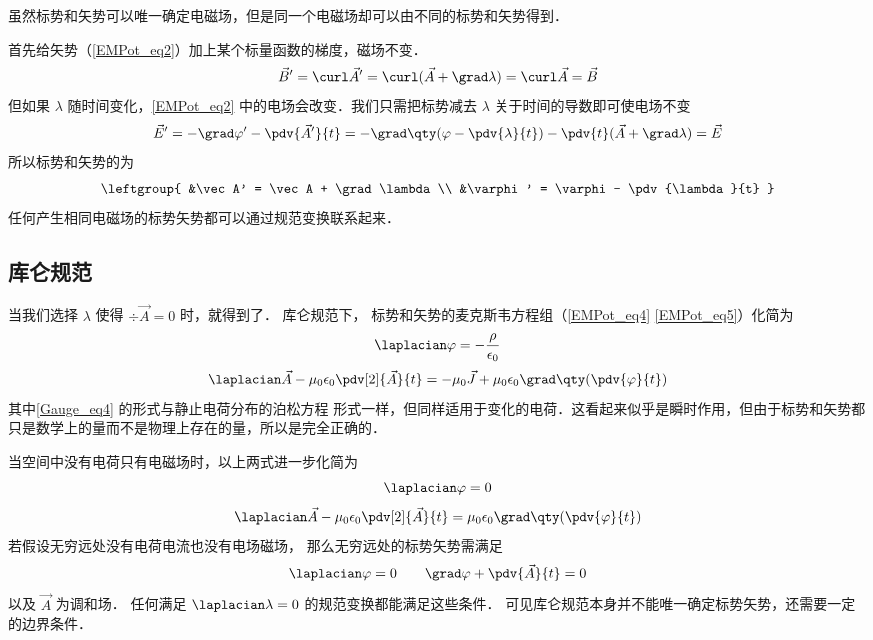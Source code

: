
虽然标势和矢势可以唯一确定电磁场，但是同一个电磁场却可以由不同的标势和矢势得到．

首先给矢势（\autoref{EMPot_eq2}）加上某个标量函数的梯度，磁场不变．
\begin{equation}
\vec B' = \curl \vec A' = \curl (\vec A + \grad \lambda) = \curl \vec A = \vec B
\end{equation}
但如果 $\lambda$ 随时间变化，\autoref{EMPot_eq2} 中的电场会改变．我们只需把标势减去 $\lambda$ 关于时间的导数即可使电场不变
\begin{equation}
\vec E' = -\grad \varphi' - \pdv{\vec A'}{t} = -\grad \qty(\varphi - \pdv{\lambda}{t}) - \pdv{t} (\vec A + \grad \lambda) = \vec E
\end{equation}
所以标势和矢势的为
\begin{equation}\label{EMPot_eq3}
\leftgroup{
&\vec A' = \vec A + \grad \lambda\\
&\varphi' = \varphi - \pdv{\lambda}{t}
}\end{equation}
任何产生相同电磁场的标势矢势都可以通过规范变换联系起来．

\subsection{库仑规范}
当我们选择 $\lambda$ 使得 $\div \vec A = 0$ 时，就得到了． 库仑规范下， 标势和矢势的麦克斯韦方程组（\autoref{EMPot_eq4} \autoref{EMPot_eq5}）化简为
\begin{equation}\label{Gauge_eq4}
\laplacian \varphi = -\frac{\rho}{\epsilon_0}
\end{equation}
\begin{equation}\label{Gauge_eq5}
\laplacian \vec A - \mu_0\epsilon_0 \pdv[2]{\vec A}{t} = -\mu_0\vec J + \mu_0\epsilon_0 \grad\qty(\pdv{\varphi}{t})
\end{equation}
其中\autoref{Gauge_eq4} 的形式与静止电荷分布的泊松方程%
形式一样，但同样适用于变化的电荷．这看起来似乎是瞬时作用，但由于标势和矢势都只是数学上的量而不是物理上存在的量，所以是完全正确的．

当空间中没有电荷只有电磁场时，以上两式进一步化简为
\begin{equation}
\laplacian \varphi = 0
\end{equation}
\begin{equation}\label{Gauge_eq5}
\laplacian \vec A - \mu_0\epsilon_0 \pdv[2]{\vec A}{t} = \mu_0\epsilon_0 \grad\qty(\pdv{\varphi}{t})
\end{equation}
若假设无穷远处没有电荷电流也没有电场磁场， 那么无穷远处的标势矢势需满足
\begin{equation}
\laplacian \varphi = 0 \qquad
\grad \varphi + \pdv{\vec A}{t} = 0
\end{equation}
以及 $\vec A$ 为调和场． 任何满足 $\laplacian \lambda = 0$ 的规范变换都能满足这些条件． 可见库仑规范本身并不能唯一确定标势矢势，还需要一定的边界条件．

